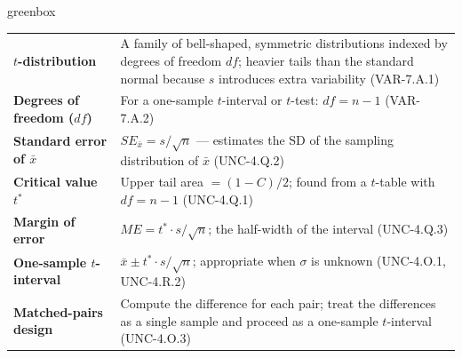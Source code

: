 \documentclass[10pt]{article}
\begin{document}
\begin{skillbox}{greenbox}
\renewcommand{\arraystretch}{1.3}
\begin{tabularx}{\linewidth}{lX}
    \textbf{$t$-distribution} &
        A family of bell-shaped, symmetric distributions indexed by degrees of freedom
        $df$; heavier tails than the standard normal because $s$ introduces extra
        variability (VAR-7.A.1) \\
    \textbf{Degrees of freedom ($df$)} &
        For a one-sample $t$-interval or $t$-test: $df = n - 1$ (VAR-7.A.2) \\
    \textbf{Standard error of $\bar x$} &
        $SE_{\bar x} = s/\sqrt{n}$ --- estimates the SD of the sampling distribution
        of $\bar x$ (UNC-4.Q.2) \\
    \textbf{Critical value $t^*$} &
        Upper tail area $= (1 - C)/2$; found from a $t$-table with $df = n - 1$
        (UNC-4.Q.1) \\
    \textbf{Margin of error} &
        $ME = t^* \cdot s/\sqrt{n}$; the half-width of the interval (UNC-4.Q.3) \\
    \textbf{One-sample $t$-interval} &
        $\bar x \pm t^* \cdot s/\sqrt{n}$; appropriate when $\sigma$ is unknown
        (UNC-4.O.1, UNC-4.R.2) \\
    \textbf{Matched-pairs design} &
        Compute the difference for each pair; treat the differences as a single
        sample and proceed as a one-sample $t$-interval (UNC-4.O.3) \\
\end{tabularx}
\end{skillbox}
\end{document}
